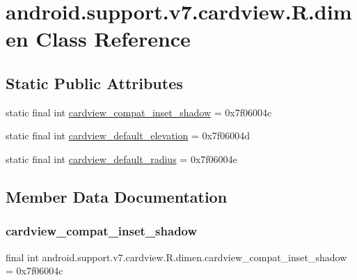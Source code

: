 \hypertarget{classandroid_1_1support_1_1v7_1_1cardview_1_1R_1_1dimen}{}\section{android.\+support.\+v7.\+cardview.\+R.\+dimen Class Reference}
\label{classandroid_1_1support_1_1v7_1_1cardview_1_1R_1_1dimen}
\subsection*{Static Public Attributes}
\begin{DoxyCompactItemize}
\item 
static final int \mbox{\hyperlink{classandroid_1_1support_1_1v7_1_1cardview_1_1R_1_1dimen_a41240cc5e8b3945b348e9a020920796c}{cardview\+\_\+compat\+\_\+inset\+\_\+shadow}} = 0x7f06004c
\item 
static final int \mbox{\hyperlink{classandroid_1_1support_1_1v7_1_1cardview_1_1R_1_1dimen_ac932db5781965041bc4101ffa64e2821}{cardview\+\_\+default\+\_\+elevation}} = 0x7f06004d
\item 
static final int \mbox{\hyperlink{classandroid_1_1support_1_1v7_1_1cardview_1_1R_1_1dimen_aa86bbc009cc82836eb1bfede3c6ad656}{cardview\+\_\+default\+\_\+radius}} = 0x7f06004e
\end{DoxyCompactItemize}


\subsection{Member Data Documentation}
\mbox{\label{classandroid_1_1support_1_1v7_1_1cardview_1_1R_1_1dimen_a41240cc5e8b3945b348e9a020920796c}} 
\subsubsection{\texorpdfstring{cardview\+\_\+compat\+\_\+inset\+\_\+shadow}{cardview\_compat\_inset\_shadow}}
{\footnotesize\ttfamily final int android.\+support.\+v7.\+cardview.\+R.\+dimen.\+cardview\+\_\+compat\+\_\+inset\+\_\+shadow = 0x7f06004c\hspace{0.3cm}{\ttfamily [static]}}

